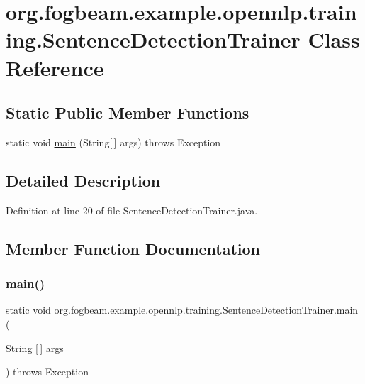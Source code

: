 \hypertarget{classorg_1_1fogbeam_1_1example_1_1opennlp_1_1training_1_1_sentence_detection_trainer}{}\section{org.\+fogbeam.\+example.\+opennlp.\+training.\+Sentence\+Detection\+Trainer Class Reference}
\label{classorg_1_1fogbeam_1_1example_1_1opennlp_1_1training_1_1_sentence_detection_trainer}
\subsection*{Static Public Member Functions}
\begin{DoxyCompactItemize}
\item 
static void \hyperlink{classorg_1_1fogbeam_1_1example_1_1opennlp_1_1training_1_1_sentence_detection_trainer_ac80405591298c5f1e235179d40555dce}{main} (String\mbox{[}$\,$\mbox{]} args)  throws Exception 	
\end{DoxyCompactItemize}


\subsection{Detailed Description}


Definition at line 20 of file Sentence\+Detection\+Trainer.\+java.



\subsection{Member Function Documentation}
\hypertarget{classorg_1_1fogbeam_1_1example_1_1opennlp_1_1training_1_1_sentence_detection_trainer_ac80405591298c5f1e235179d40555dce}{}\label{classorg_1_1fogbeam_1_1example_1_1opennlp_1_1training_1_1_sentence_detection_trainer_ac80405591298c5f1e235179d40555dce} 
\subsubsection{\texorpdfstring{main()}{main()}}
{\footnotesize\ttfamily static void org.\+fogbeam.\+example.\+opennlp.\+training.\+Sentence\+Detection\+Trainer.\+main (\begin{DoxyParamCaption}\item[{String \mbox{[}$\,$\mbox{]}}]{args }\end{DoxyParamCaption}) throws Exception\hspace{0.3cm}{\ttfamily [static]}}



